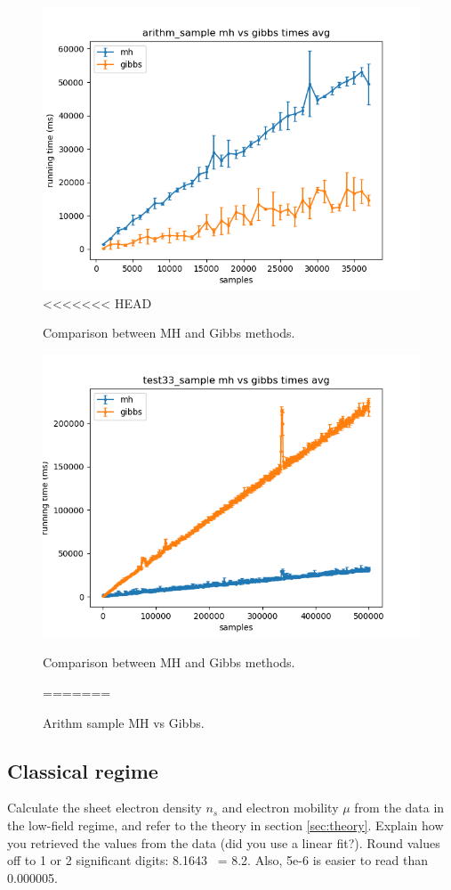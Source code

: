 \documentclass[a4paper]{article}
\begin{document}
\begin{figure}
\centering
\includegraphics[width=1\textwidth]{plot_arithm_sample_mh_vs_gibbs_times.png}
<<<<<<< HEAD
\caption{\label{fig:data}Comparison between MH and Gibbs methods.}
\end{figure}

\begin{figure}
\centering
\includegraphics[width=1\textwidth]{plot_test33_sample_mh_vs_gibbs_times.png}
\caption{\label{fig:data}Comparison between MH and Gibbs methods.}
=======
\caption{\label{fig:data}Arithm sample MH vs Gibbs.}
\end{figure}



\subsection{Classical regime}
Calculate the sheet electron density $n_{s}$ and electron mobility $\mu$ from the data in the low-field regime, and refer to the theory in section \ref{sec:theory}. Explain how you retrieved the values from the data (did you use a linear fit?).
Round values off to 1 or 2 significant digits: 8.1643 ~= 8.2. Also, 5e-6 is easier to read than 0.000005.
\end{document}
